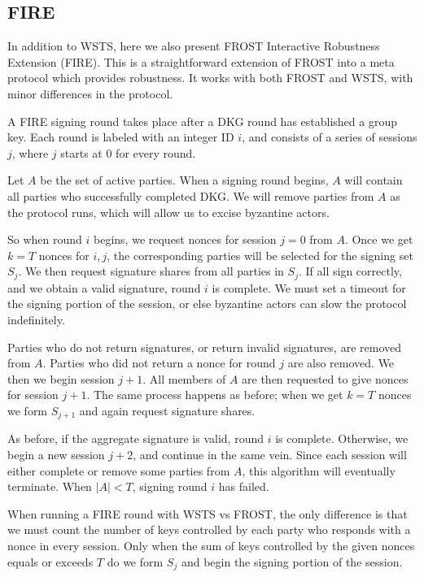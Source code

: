 \documentclass{article}
\begin{document}
\subsection{
  FIRE
}

In addition to WSTS, here we also present FROST Interactive Robustness Extension (FIRE).  This is a straightforward extension of FROST into a meta protocol which provides robustness.  It works with both FROST and WSTS, with minor differences in the protocol.

A FIRE signing round takes place after a DKG round has established a group key.  Each round is labeled with an integer ID $i$, and consists of a series of sessions $j$, where $j$ starts at $0$ for every round.

Let $A$ be the set of active parties.  When a signing round begins, $A$ will contain all parties who successfully completed DKG.  We will remove parties from $A$ as the protocol runs, which will allow us to excise byzantine actors.

So when round $i$ begins, we request nonces for session $j = 0$ from $A$.  Once we get $k = T$ nonces for $i,j$, the corresponding parties will be selected for the signing set $S_j$.  We then request signature shares from all parties in $S_j$.  If all sign correctly, and we obtain a valid signature, round $i$ is complete.  We must set a timeout for the signing portion of the session, or else byzantine actors can slow the protocol indefinitely.

Parties who do not return signatures, or return invalid signatures, are removed from $A$.  Parties who did not return a nonce for round $j$ are also removed.  We then we begin session $j+1$.  All members of $A$ are then requested to give nonces for session $j+1$.  The same process happens as before; when we get $k = T$ nonces we form $S_{j+1}$ and again request signature shares.

As before, if the aggregate signature is valid, round $i$ is complete.  Otherwise, we begin a new session $j+2$, and continue in the same vein.  Since each session will either complete or remove some parties from $A$, this algorithm will eventually terminate.  When $|A| < T$, signing round $i$ has failed.

When running a FIRE round with WSTS vs FROST, the only difference is that we must count the number of keys controlled by each party who responds with a nonce in every session.  Only when the sum of keys controlled by the given nonces equals or exceeds $T$ do we form $S_j$ and begin the signing portion of the session.  
\end{document}
